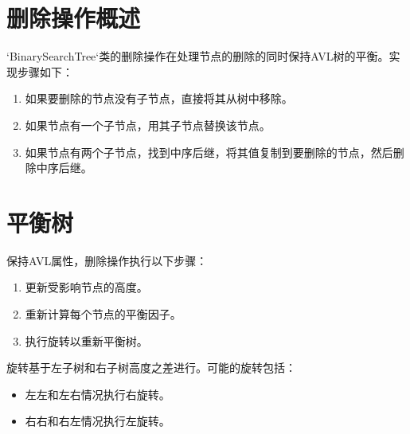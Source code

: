 \documentclass[UTF8]{ctexart}
\begin{document}
\pagestyle{fancy}
\fancyhead{}

\section{删除操作概述}
`BinarySearchTree`类的删除操作在处理节点的删除的同时保持AVL树的平衡。实现步骤如下：

\begin{enumerate}
    \item 如果要删除的节点没有子节点，直接将其从树中移除。
    \item 如果节点有一个子节点，用其子节点替换该节点。
    \item 如果节点有两个子节点，找到中序后继，将其值复制到要删除的节点，然后删除中序后继。
\end{enumerate}

\section{平衡树}
保持AVL属性，删除操作执行以下步骤：

\begin{enumerate}
    \item 更新受影响节点的高度。
    \item 重新计算每个节点的平衡因子。
    \item 执行旋转以重新平衡树。
\end{enumerate}

旋转基于左子树和右子树高度之差进行。可能的旋转包括：

\begin{itemize}
    \item 左左和左右情况执行右旋转。
    \item 右右和右左情况执行左旋转。
\end{itemize}
\end{document}
